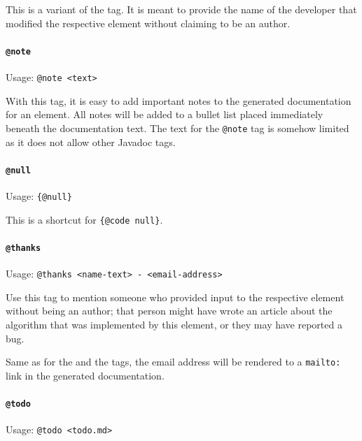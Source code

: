 This is a variant of the  tag. It is meant to provide the name of the developer that modified the respective element without claiming to be an author.


\paragraph{\lstinline|@note|}\label{sec:TagNote}  Usage: \lstinline|@note <text>|

With this tag, it is easy to add important notes to the generated documentation for an element. All notes will be added to a bullet list placed immediately beneath the documentation text. The text for the \lstinline|@note| tag is somehow limited as it does not allow other Javadoc tags.


\paragraph{\lstinline|@null|}\label{sec:TagNULL}  Usage: \lstinline|{@null}|

This is a shortcut for \lstinline|{@code null}|.


\paragraph{\lstinline|@thanks|}\label{sec:TagThanks}  Usage: \lstinline|@thanks <name-text> - <email-address>|

Use this tag to mention someone who provided input to the respective element without being an author; that person might have wrote an article about the algorithm that was implemented by this element, or they may have reported a bug.

Same as for the  and the  tags, the email address will be rendered to a \verb#mailto:# link in the generated documentation.


\paragraph{\lstinline|@todo|}\label{sec:TagTodo}  Usage: \lstinline|@todo <todo.md>|

